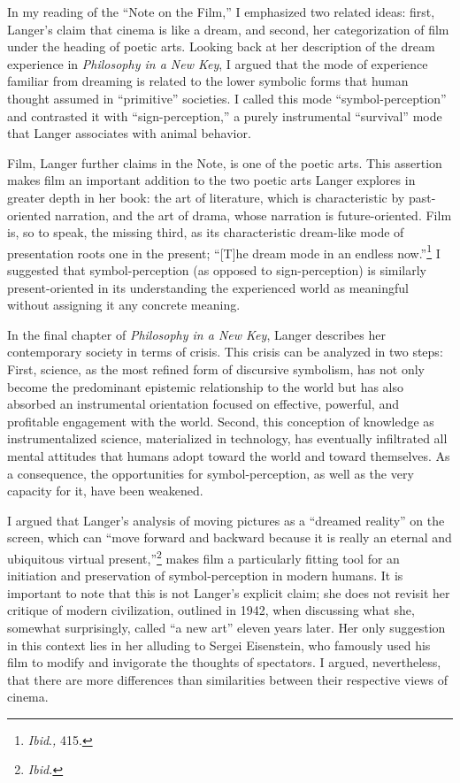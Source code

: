 \documentclass{tufte-handout}
\begin{document}
In my reading of the ``Note on the Film,'' I emphasized two related
ideas: first, Langer's claim that cinema is like a dream, and second,
her categorization of film under the heading of poetic arts. Looking
back at her description of the dream experience in \emph{Philosophy in a
New Key}, I argued that the mode of experience familiar from dreaming is
related to the lower symbolic forms that human thought assumed in
``primitive'' societies. I called this mode ``symbol-perception'' and
contrasted it with ``sign-perception,'' a purely instrumental
``survival'' mode that Langer associates with animal behavior.

Film, Langer further claims in the Note, is one of the poetic arts. This
assertion makes film an important addition to the two poetic arts Langer
explores in greater depth in her book: the art of literature, which is
characteristic by past-oriented narration, and the art of drama, whose
narration is future-oriented. Film is, so to speak, the missing third,
as its characteristic dream-like mode of presentation roots one in the
present; ``{[}T{]}he dream mode in an endless now.''\footnote{\emph{Ibid}.\emph{,}
  415.} I suggested that symbol-perception (as opposed to
sign-perception) is similarly present-oriented in its understanding the
experienced world as meaningful without assigning it any concrete
meaning.

In the final chapter of \emph{Philosophy in a New Key}, Langer describes
her contemporary society in terms of crisis. This crisis can be analyzed
in two steps: First, science, as the most refined form of discursive
symbolism, has not only become the predominant epistemic relationship to
the world but has also absorbed an instrumental orientation focused on
effective, powerful, and profitable engagement with the world. Second,
this conception of knowledge as instrumentalized science, materialized
in technology, has eventually infiltrated all mental attitudes that
humans adopt toward the world and toward themselves. As a consequence,
the opportunities for symbol-perception, as well as the very capacity
for it, have been weakened.

I argued that Langer's analysis of moving pictures as a ``dreamed
reality'' on the screen, which can ``move forward and backward because
it is really an eternal and ubiquitous virtual present,''\footnote{\emph{Ibid.}}
makes film a particularly fitting tool for an initiation and
preservation of symbol-perception in modern humans. It is important to
note that this is not Langer's explicit claim; she does not revisit her
critique of modern civilization, outlined in 1942, when discussing what
she, somewhat surprisingly, called ``a new art'' eleven years later. Her
only suggestion in this context lies in her alluding to Sergei
Eisenstein, who famously used his film to modify and invigorate the
thoughts of spectators. I argued, nevertheless, that there are more
differences than similarities between their respective views of cinema.
\end{document}
